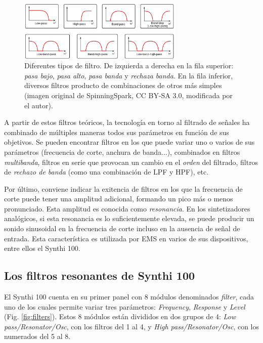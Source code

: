 \begin{figure}
	\centering
	\includegraphics[width=0.7\textwidth]{images/filtersgraph}
	\caption[Tipos de filtro]{Diferentes tipos de filtro. De izquierda a derecha en la fila superior: \textit{pasa bajo}, \textit{pasa alto}, \textit{pasa banda} y \textit{rechaza banda}. En la fila inferior, diversos filtros producto de combinaciones de otros más simples (imagen original de SpinningSpark, CC BY-SA 3.0, modificada por el autor).}
	\label{fig:filtersgraph}
\end{figure}

A partir de estos filtros teóricos, la tecnología en torno al filtrado de señales ha combinado de múltiples maneras todos sus parámetros en función de sus objetivos. Se pueden encontrar filtros en los que puede variar uno o varios de sus parámetros (frecuencia de corte, anchura de banda...), combinados en filtros \textit{multibanda}, filtros en serie que provocan un cambio en el \textit{orden} del filtrado, filtros de \textit{rechazo de banda} (como una combinación de LPF y HPF), etc.

Por último, conviene indicar la exitencia de filtros en los que la frecuencia de corte puede tener una amplitud adicional, formando un pico más o menos pronunciado. Esta amplitud es conocida como \textit{resonancia}. En los sintetizadores analógicos, si esta resonancia es lo suficientemente elevada, se puede producir un sonido sinusoidal en la frecuencia de corte incluso en la ausencia de señal de entrada. Esta característica es utilizada por EMS en varios de sus dispositivos, entre ellos el Synthi 100.


\subsection{Los filtros resonantes de Synthi 100}

El Synthi 100 cuenta en su primer panel con 8 módulos denominados \textit{filter}, cada uno de los cuales permite variar tres parámetros: \textit{Frequency}, \textit{Response} y \textit{Level} (Fig. \ref{fig:filters}). Estos 8 módulos están divididos en dos grupos de 4: \textit{Low pass/Resonator/Osc}, con los filtros del 1 al 4, y \textit{High pass/Resonator/Osc}, con los numerados del 5 al 8.

